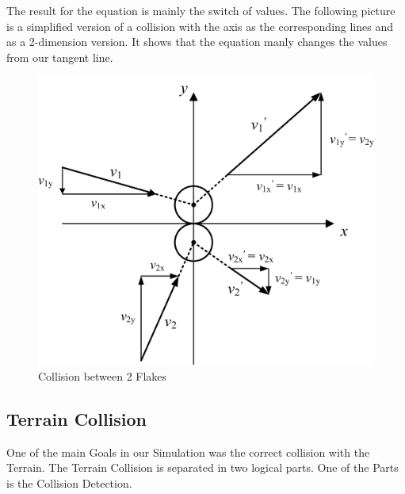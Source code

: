 \documentclass{sig-alternate-05-2015}
\begin{document}
The result for the equation is mainly the switch of values. The following picture is a simplified version of a collision with the axis as the corresponding lines and as a 2-dimension version. It shows that the equation manly changes the values from our tangent line.
\begin{figure}[!htbp]
  \begin{center}
\includegraphics[scale=0.85]{CollisionSphere.png}
  \end{center}
  \caption{Collision between 2 Flakes}
\end{figure}
\subsection{Terrain Collision}
One of the main Goals in our Simulation was the correct collision with the Terrain. The Terrain Collision is separated in two logical parts. One of the Parts is the Collision Detection.\\
\end{document}
